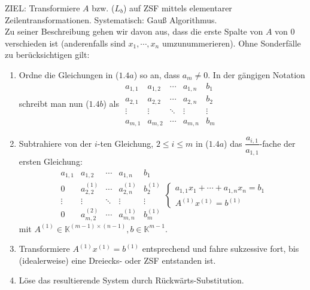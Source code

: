 ZIEL: Transformiere $A$ bzw. ($L_b$) auf ZSF mittels elementarer Zeilentransformationen.  Systematisch: Gauß Algorithmus.\\
Zu seiner Beschreibung gehen wir davon aus, dass die erste Spalte von $A$ von $0$ verschieden ist (anderenfalls sind $x_1,\cdots ,x_n$ umzunummerieren).  Ohne Sonderfälle zu berücksichtigen gilt:
\begin{enumerate}
\item Ordne die Gleichungen in ($1.4a$) so an, dass $a_m\not= 0$.  In der gängigen Notation schreibt man nun ($1.4b$) als $\begin{array}{cccc|c}a_{1,1} & a_{1,2} & \cdots & a_{1,n} & b_1\\a_{2,1} & a_{2,2} & \cdots & a_{2,n} & b_2\\\vdots & \vdots & \ddots &\vdots &\vdots \\a_{m,1} & a_{m,2} & \cdots & a_{m,n} & b_m\end{array}$
\item Subtrahiere von der $i$-ten Gleichung, $2\leq i\leq m$ in ($1.4a$) das $\dfrac{a_{i,1}}{a_{1,1}}$-fache der ersten Gleichung: 
\[\begin{array}{cccc|c}a_{1,1} & a_{1,2} & \cdots & a_{1,n} & b_1\\0 & a_{2,2}^{(1)} & \cdots & a_{2,n}^{(1)} & b_2^{(1)}\\ \vdots &\vdots &\ddots &\vdots &\vdots \\0 & a_{m,2}^{(2)} & \cdots & a_{m,n}^{(1)} & b_m^{(1)}\end{array} \begin{cases}a_{1,1}x_1+\cdots + a_{1,n}x_n=b_1 \\ A^{(1)}x^{(1)} = b^{(1)}\end{cases}\]
mit $A^{(1)}\in\mathbb{K}^{(m-1)\times (n-1)},b\in \mathbb{K}^{m-1}$.
\item Transformiere $A^{(1)}x^{(1)} = b^{(1)}$ entsprechend und fahre sukzessive fort, bis (idealerweise) eine Dreiecks- oder ZSF entstanden ist.
\item Löse das resultierende System durch Rückwärts-Substitution.
\end{enumerate}
